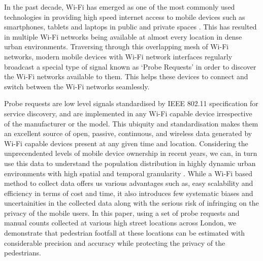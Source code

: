 In the past decade, Wi-Fi has emerged as one of the most commonly used
technologies in providing high speed internet access to mobile devices such as
smartphones, tablets and laptops in public and private spaces
\citep{torrens2008wi}. This has resulted in multiple Wi-Fi networks being
available at almost every location in dense urban environments. Traversing
through this overlapping mesh of Wi-Fi networks, modern mobile devices with
Wi-Fi network interfaces regularly broadcast a special type of signal known as
`Probe Requests' in order to discover the Wi-Fi networks available to them.
This helps these devices to connect and switch between the Wi-Fi networks
seamlessly.

Probe requests are low level signals standardised by IEEE 802.11 specification
\citep{ieee2016} for service discovery, and are implemented in any Wi-Fi
capable device irrespective of the manufacturer or the model. This ubiquity and
standardisation makes them an excellent source of open, passive, continuous,
and wireless data generated by Wi-Fi capable devices present at any given time
and location. Considering the unprecendented levels of mobile device ownership
in recent years, we can, in turn use this data to understand the population
distribution in highly dynamic urban environments with high spatial and
temporal granularity \citep{freud2015, konto2017}. While a Wi-Fi based method to
collect data offers us various advantages such as, easy scalability and
efficiency in terms of cost and time, it also introduces few systematic biases
and uncertainities in the collected data along with the serious risk of
infringing on the privacy of the mobile users. In this paper, using a set of
probe requests and manual counts collected at various high street locations
across London, we demonstrate that pedestrian footfall at these locations can
be estimated with considerable precision and accuracy while protecting the
privacy of the pedestrians.

